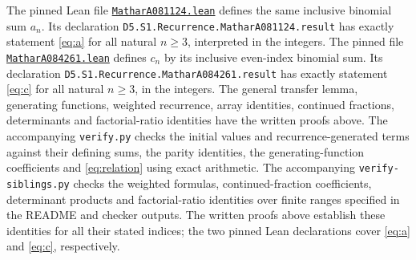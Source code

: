 \documentclass[11pt]{article}
\begin{document}
The pinned Lean file
\href{https://github.com/the-omega-institute/trureturing/blob/13f4288c2940bd2aa4020cec789956b9265769f5/D5/S1/Recurrence/MatharA081124.lean}{\texttt{MatharA081124.lean}}
defines the same inclusive binomial sum $a_n$. Its declaration
\nolinkurl{D5.S1.Recurrence.MatharA081124.result} has exactly statement
\eqref{eq:a} for all natural $n\geq3$, interpreted in the integers.
The pinned file
\href{https://github.com/the-omega-institute/trureturing/blob/50af3c7111e85c1112ee9dbc6e721adbb759a26b/D5/S1/Recurrence/MatharA084261.lean}{\texttt{MatharA084261.lean}}
defines $c_n$ by its inclusive even-index binomial sum. Its declaration
\nolinkurl{D5.S1.Recurrence.MatharA084261.result} has exactly statement
\eqref{eq:c} for all natural $n\geq3$, in the integers.
The general transfer lemma, generating functions, weighted recurrence,
array identities, continued fractions, determinants and factorial-ratio
identities have the written proofs above.
The accompanying \texttt{verify.py} checks the initial values and
recurrence-generated terms against their defining sums, the parity
identities, the generating-function coefficients and \eqref{eq:relation}
using exact arithmetic. The accompanying \texttt{verify-siblings.py}
checks the weighted formulas, continued-fraction coefficients, determinant
products and factorial-ratio identities over finite ranges specified in
the README and checker outputs. The written proofs above establish these
identities for all their stated indices; the two pinned Lean declarations
cover \eqref{eq:a} and \eqref{eq:c}, respectively.
\end{document}
